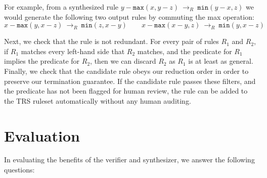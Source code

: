 \documentclass[acmsmall,review]{acmart}\settopmatter{printfolios=true,printccs=false,printacmref=false}
\newcommand{\hmax}[0]{\texttt{max}}
\newcommand{\hmin}[0]{\texttt{min}}
\newcommand{\rewrites}[0]{\:\rightarrow_{R}\:}
\begin{document}
For example, from a synthesized rule $y - \hmax(x, y - z) \rewrites \hmin(y - x, z)$ we would generate the following two
output rules by commuting the max operation:
\[
x - \hmax(y, x - z) \rewrites \hmin(z, x - y) \qquad x - \hmax(x - y, z) \rewrites \hmin(y, x - z)
\]

Next, we check that the rule is not redundant. For every pair of rules
$R_1$ and $R_2$, if $R_1$ matches every left-hand side that $R_2$
matches, and the predicate for $R_1$ implies the predicate for $R_2$,
then we can discard $R_2$ as $R_1$ is at least as general. Finally, we
check that the candidate rule obeys our reduction order in order to
preserve our termination guarantee. If the candidate rule passes these
filters, and the predicate has not been flagged for human review, the
rule can be added to the TRS ruleset automatically without any human
auditing.

\section{Evaluation}

\newcommand{\PercentPossibleToSynth}{69\%}
\newcommand{\NumRulesInCorrectnessExperiment}{321}
\newcommand{\PercentRulesResynthesized}{58\%}

In evaluating the benefits of the verifier and synthesizer, we answer the following questions:
\end{document}
